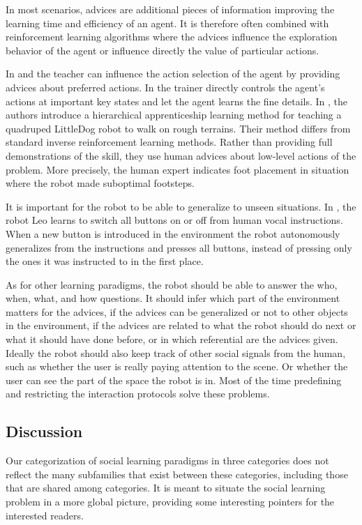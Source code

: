 In most scenarios, advices are additional pieces of information improving the learning time and efficiency of an agent. It is therefore often combined with reinforcement learning algorithms where the advices influence the exploration behavior of the agent or influence directly the value of particular actions. 

In \cite{clouse1992teaching} and \cite{maclin2005giving} the teacher can influence the action selection of the agent by providing advices about preferred actions. In  \cite{smart2002effective} the trainer directly controls the agent's actions at important key states and let the agent learns the fine details. In \cite{kolter2007hierarchical}, the authors introduce a hierarchical apprenticeship learning method for teaching a quadruped LittleDog robot to walk on rough terrains. Their method differs from standard inverse reinforcement learning methods. Rather than providing full demonstrations of the skill, they use human advices about low-level actions of the problem. More precisely, the human expert indicates foot placement in situation where the robot made suboptimal footsteps.

It is important for the robot to be able to generalize to unseen situations. In \cite{lockerd2004tutelage}, the robot Leo learns to switch all buttons on or off from human vocal instructions. When a new button is introduced in the environment the robot autonomously generalizes from the instructions and presses all buttons, instead of pressing only the ones it was instructed to in the first place.


As for other learning paradigms, the robot should be able to answer the who, when, what, and how questions. It should infer which part of the environment matters for the advices, if the advices can be generalized or not to other objects in the environment, if the advices are related to what the robot should do next or what it should have done before, or in which referential are the advices given. Ideally the robot should also keep track of other social signals from the human, such as whether the user is really paying attention to the scene.  Or whether the user can see the part of the space the robot is in. Most of the time predefining and restricting the interaction protocols solve these problems.

\subsection{Discussion}

Our categorization of social learning paradigms in three categories does not reflect the many subfamilies that exist between these categories, including those that are shared among categories. It is meant to situate the social learning problem in a more global picture, providing some interesting pointers for the interested readers. 

